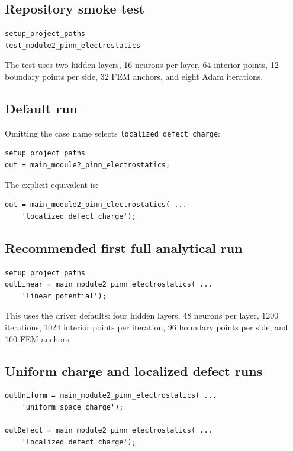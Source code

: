\documentclass[11pt]{article}
\begin{document}
\subsection{Repository smoke test}

\begin{lstlisting}[style=projectmatlab]
setup_project_paths
test_module2_pinn_electrostatics
\end{lstlisting}
The test uses two hidden layers, 16 neurons per layer, 64 interior points, 12 boundary points per side, 32 FEM anchors, and eight Adam iterations.

\subsection{Default run}

Omitting the case name selects \texttt{localized\_defect\_charge}:
\begin{lstlisting}[style=projectmatlab]
setup_project_paths
out = main_module2_pinn_electrostatics;
\end{lstlisting}
The explicit equivalent is:
\begin{lstlisting}[style=projectmatlab]
out = main_module2_pinn_electrostatics( ...
    'localized_defect_charge');
\end{lstlisting}

\subsection{Recommended first full analytical run}

\begin{lstlisting}[style=projectmatlab]
setup_project_paths
outLinear = main_module2_pinn_electrostatics( ...
    'linear_potential');
\end{lstlisting}
This uses the driver defaults: four hidden layers, 48 neurons per layer, 1200 iterations, 1024 interior points per iteration, 96 boundary points per side, and 160 FEM anchors.

\subsection{Uniform charge and localized defect runs}

\begin{lstlisting}[style=projectmatlab]
outUniform = main_module2_pinn_electrostatics( ...
    'uniform_space_charge');

outDefect = main_module2_pinn_electrostatics( ...
    'localized_defect_charge');
\end{lstlisting}
\end{document}

